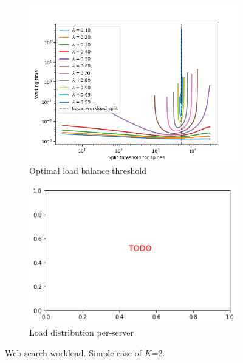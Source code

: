 \begin{figure}
	\centering
	\begin{subfigure}{.5\textwidth}
		\centering
		\includegraphics[width=.99\linewidth]{Chapter3/Figures/equal_workload_split_bpws}
		\caption{Optimal load balance threshold}
		\label{fig:cost-ws}
	\end{subfigure}%
	\begin{subfigure}{.5\textwidth}
		\centering
		\includegraphics[width=.99\linewidth]{Chapter3/Figures/todored}%
		\caption{Load distribution per-server }
		\label{fig:perspineload-ws}
	\end{subfigure}
	\caption{Web search workload. Simple case of $K$=2.}
	\label{fig:lbthreshold-ws}
\end{figure}
\\
